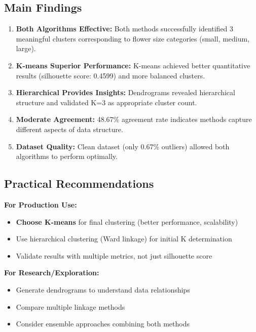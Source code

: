 \documentclass[12pt,a4paper]{article}
\begin{document}
\subsection{Main Findings}

\begin{enumerate}
    \item \textbf{Both Algorithms Effective:} Both methods successfully identified 3 meaningful clusters corresponding to flower size categories (small, medium, large).
    
    \item \textbf{K-means Superior Performance:} K-means achieved better quantitative results (silhouette score: 0.4599) and more balanced clusters.
    
    \item \textbf{Hierarchical Provides Insights:} Dendrograms revealed hierarchical structure and validated K=3 as appropriate cluster count.
    
    \item \textbf{Moderate Agreement:} 48.67\% agreement rate indicates methods capture different aspects of data structure.
    
    \item \textbf{Dataset Quality:} Clean dataset (only 0.67\% outliers) allowed both algorithms to perform optimally.
\end{enumerate}

\subsection{Practical Recommendations}

\textbf{For Production Use:}
\begin{itemize}
    \item \textbf{Choose K-means} for final clustering (better performance, scalability)
    \item Use hierarchical clustering (Ward linkage) for initial K determination
    \item Validate results with multiple metrics, not just silhouette score
\end{itemize}

\textbf{For Research/Exploration:}
\begin{itemize}
    \item Generate dendrograms to understand data relationships
    \item Compare multiple linkage methods
    \item Consider ensemble approaches combining both methods
\end{itemize}
\end{document}
